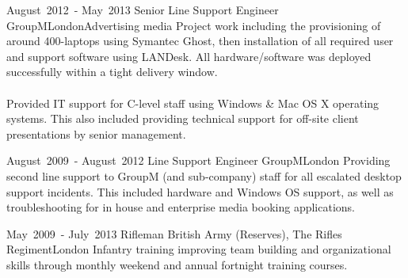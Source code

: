 
\edef\hc{\string:}
\cventry %
  {\mbox{August 2012 -} \mbox{May 2013}}
  {Senior  Line Support Engineer}
  {GroupM}{London}{Advertising media}
  {
    Project work including the provisioning of around 400-laptops using Symantec Ghost, 
    then installation of all required user and support software using LANDesk. 
    All hardware/software was deployed successfully within a tight delivery window.\\~\\
    Provided IT support for C-level staff using Windows \& Mac OS X operating systems. 
    This also included providing technical support for off-site client presentations by 
    senior management.\\
  }

\cventry %
  {\mbox{August 2009 -} \mbox{August 2012}}
  { Line Support Engineer}
  {GroupM}{London}{}
  {
    Providing second line support to GroupM (and sub-company) staff for all escalated desktop 
    support incidents. This included hardware and Windows OS support, as well as troubleshooting 
    for in house and enterprise media booking applications.\\
  }

\cventry %
  {\mbox{May 2009 -} \mbox{July 2013}}
  {Rifleman}
  {British Army (Reserves), The Rifles Regiment}{London}{}
  {
    Infantry training improving team building and organizational skills through
    monthly weekend and annual fortnight training courses.
  }

